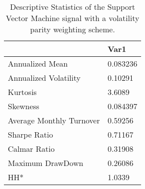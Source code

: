 \begin{table}[H]
\centering
\begin{tabular}{ll}
& Var1 \\ 
\hline 
Annualized Mean & 0.083236 \\ 
Annualized Volatility & 0.10291 \\ 
Kurtosis & 3.6089 \\ 
Skewness & 0.084397 \\ 
Average Monthly Turnover & 0.59256 \\ 
Sharpe Ratio & 0.71167 \\ 
Calmar Ratio & 0.31908 \\ 
Maximum DrawDown & 0.26086 \\ 
HH* & 1.0339 \\ 
\hline
\end{tabular}
\caption{Descriptive Statistics of the Support Vector Machine signal with a volatility parity weighting scheme.}
\label{SVM_MODEL}
\end{table}